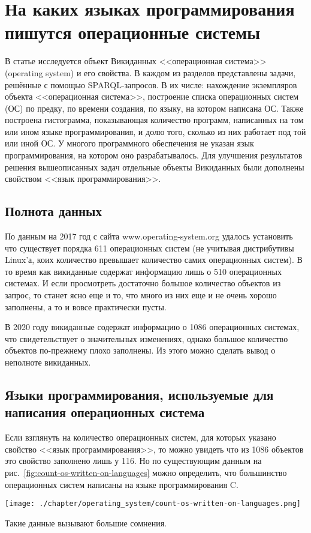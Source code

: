 \chapter{На каких языках программирования пишутся операционные системы}
\label{ch:operating-sysmets}

В статье исследуется объект Викиданных <<операционная система>> (operating system) и его свойства. В каждом из разделов представлены задачи, решённые с помощью SPARQL-запросов. В их числе: нахождение экземпляров объекта <<операционная система>>, построение списка операционных систем (ОС) по предку, по времени создания, по языку, на котором написана ОС. Также построена гистограмма, показывающая количество программ, написанных на том или ином языке программирования, и долю того, сколько из них работает под той или иной ОС. У многого программного обеспечения не указан язык программирования, на котором оно разрабатывалось. Для улучшения результатов решения вышеописанных задач отдельные объекты Викиданных были дополнены свойством <<язык программирования>>.

\section{Полнота данных}
По данным на 2017 год с сайта www.operating-system.org удалось установить что существует порядка 611 операционных систем (не учитывая дистрибутивы Linux'а, коих количество превышает количество самих операционных систем). В то время как викиданные содержат информацию лишь о 510 операционных системах. И если просмотреть достаточно большое количество объектов из запрос, то станет ясно еще и то, что много из них еще и не очень хорошо заполнены, а то и вовсе практически пусты.

В 2020 году викиданные содержат информацию о 1086 операционных системах, что свидетельствует о значительных изменениях, однако большое количество объектов по-прежнему плохо заполнены. Из этого можно сделать вывод о неполноте викиданных.

\section{Языки программирования, используемые для написания операционных система}
Если взглянуть на количество операционных систем, для которых указано свойство <<язык программирования>>, то можно увидеть что из 1086 объектов это свойство заполнено лишь у 116. Но по существующим данным на рис.~\ref{fig:count-os-written-on-languages} можно определить, что большинство операционных систем написаны на языке программирования C. 
\begin{figure*}[h!]
	\texttt{[image: ./chapter/operating\_system/count-os-written-on-languages.png]}
	\caption{Количество операционных систем, написанных на языках программирования (данные на 2020 год.)}
	\label{fig:count-os-written-on-languages}
\end{figure*}

Такие данные вызывают большие сомнения.